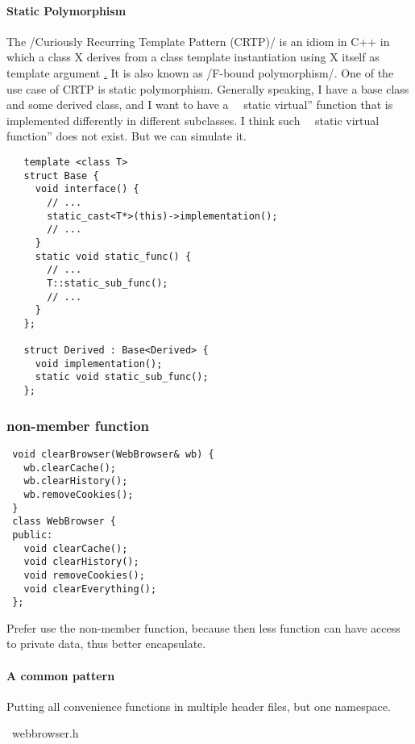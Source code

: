 \paragraph{Static Polymorphism}
The /Curiously Recurring Template Pattern (CRTP)/ is an idiom in C++
in which a class X derives from a class template instantiation using X
itself as template argument
\href{https://en.wikipedia.org/wiki/Curiously_recurring_template_pattern}.
It is also known as /F-bound polymorphism/\cite{canning1989f}.  One of
the use case of CRTP is static polymorphism.  Generally speaking, I
have a base class and some derived class, and I want to have a
~~static virtual'' function that is implemented differently in
different subclasses.  I think such ~~static virtual function'' does
not exist.  But we can simulate it.

\begin{lstlisting}
   template <class T> 
   struct Base {
     void interface() {
       // ...
       static_cast<T*>(this)->implementation();
       // ...
     } 
     static void static_func() {
       // ...
       T::static_sub_func();
       // ...
     }
   };

   struct Derived : Base<Derived> {
     void implementation();
     static void static_sub_func();
   };
\end{lstlisting}


\subsubsection{non-member function}

\begin{lstlisting}
 void clearBrowser(WebBrowser& wb) {
   wb.clearCache();
   wb.clearHistory();
   wb.removeCookies();
 }
 class WebBrowser {
 public:
   void clearCache();
   void clearHistory();
   void removeCookies();
   void clearEverything();
 };
\end{lstlisting}

Prefer use the non-member function, because then less function can
have access to private data, thus better encapsulate.

\paragraph{A common pattern}

Putting all convenience functions in multiple header files, but one
namespace.

~webbrowser.h~


